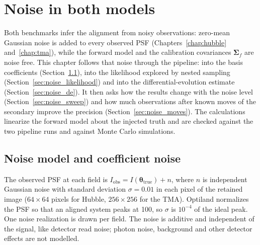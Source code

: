 \chapter{Noise in both models}\label{chap:noise}
\thispagestyle{fancy} %

Both benchmarks infer the alignment from noisy observations: zero-mean Gaussian noise is added to every observed PSF (Chapters~\ref{chap:hubble} and~\ref{chap:tma}), while the forward model and the calibration covariances $\boldsymbol{\Sigma}_f$ are noise free. This chapter follows that noise through the pipeline: into the basis coefficients (Section~\ref{sec:noise_model}), into the likelihood explored by nested sampling (Section~\ref{sec:noise_likelihood}) and into the differential-evolution estimate (Section~\ref{sec:noise_de}). It then asks how the results change with the noise level (Section~\ref{sec:noise_sweep}) and how much observations after known moves of the secondary improve the precision (Section~\ref{sec:noise_moves}). The calculations linearize the forward model about the injected truth and are checked against the two pipeline runs and against Monte Carlo simulations.

\section{Noise model and coefficient noise}\label{sec:noise_model}

The observed PSF at each field is $I_{\mathrm{obs}} = I(\boldsymbol{\theta}_{\mathrm{true}}) + n$, where $n$ is independent Gaussian noise with standard deviation $\sigma = 0.01$ in each pixel of the retained image ($64\times64$ pixels for Hubble, $256\times256$ for the TMA). Optiland normalizes the PSF so that an aligned system peaks at 100, so $\sigma$ is $10^{-4}$ of the ideal peak. One noise realization is drawn per field. The noise is additive and independent of the signal, like detector read noise; photon noise, background and other detector effects are not modelled.

